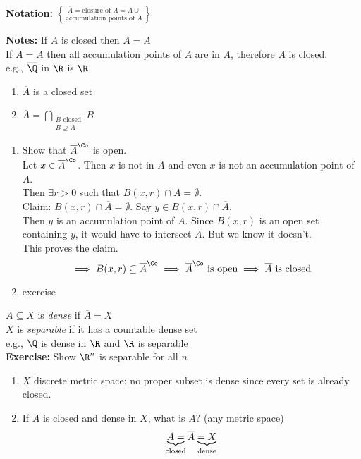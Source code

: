 \textbf{Notation:} $\overline{A}=\text{closure of $A$}=A\cup\brace{\text{accumulation points of $A$}}$

\textbf{Notes:} If $A$ is closed then $\overline A=A$ \\
If $\overline A=A$ then all accumulation points of $A$ are in $A$, therefore $A$ is closed. \\
e.g., $\overline\Q$ in $\R$ is $\R$.

\thm \begin{enumerate}
\item $\overline A$ is a closed set
\item $\overline A=\bigcap_{\substack{\text{$B$ closed}\\ B\supseteq A}} B$
\end{enumerate}
\pf \begin{enumerate}
\item Show that $\overline{A}^\Co$ is open. \\
Let $x\in\overline A^\Co$.  Then $x$ is not in $A$ and even $x$ is not an accumulation point of $A$. \\
Then $\exists r>0$ such that $B(x,r)\cap A=\emptyset$. \\
Claim: $B(x,r)\cap\overline A=\emptyset$.  Say $y\in B(x,r)\cap\overline A$. \\
Then $y$ is an accumulation point of $A$.  Since $B(x,r)$ is an open set containing $y$, it would have to intersect $A$.  But we know it doesn't. \\
This proves the claim.
\[ \implies B(x,r)\subseteq\overline A^\Co \implies \overline A^\Co\text{ is open} \implies \overline A \text{ is closed} \]
\item exercise
\end{enumerate}
 $A\subseteq X$ is \emph{dense} if $\overline A=X$ \\
 $X$ is \emph{separable} if it has a countable dense set \\
e.g., $\Q$ is dense in $\R$ and $\R$ is separable \\
\textbf{Exercise:} Show $\R^n$ is separable for all $n$
\begin{enumerate}
\item $X$ discrete metric space: no proper subset is dense since every set is already closed.
\item If $A$ is closed and dense in $X$, what is $A$? (any metric space)
\[ \mathrel{\underbrace{A=}_\text{\clap{closed}}} {}\overline A{} \mathrel{\underbrace{=X}_\text{\clap{dense}}} \]
\end{enumerate}
